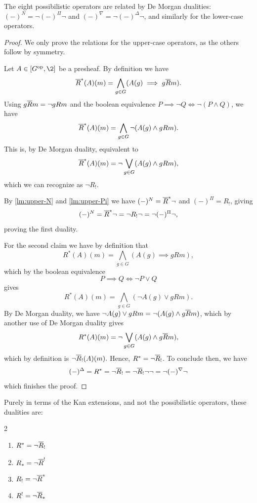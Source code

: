 \begin{lemma}
    \label{lm:De-Morgan-duality}
    The eight possibilistic operators are related by De Morgan dualities: $(-)^N = \neg (-)^\Pi \neg$ and $(-)^\nabla = \neg (-)^\Delta \neg$, and similarly for the lower-case operators. 
\end{lemma}
\begin{proof}
    We only prove the relations for the upper-case operators, as the others follow by symmetry. 

    Let $A\in [G\op, \2]$ be a presheaf. By definition we have 
    \[\overline{R}^*(A)(m) = \bigwedge_{g\in G}(A(g)\implies g\overline{R} m).\]
    Using $g \overline{R} m = \neg gRm$ and the boolean equivalence $P\implies \neg Q \iff \neg (P\wedge Q)$, we have 
    \[\overline{R}^*(A)(m) = \bigwedge_{g\in G}\neg (A(g)\wedge g R m).\]
    This is, by De Morgan duality, equivalent to 
    \[\overline{R}^*(A)(m) = \neg\bigvee_{g\in G}(A(g)\wedge g R m),\]
    which we can recognize as $\neg R_!$. 

    By \cref{lm:upper-N} and \cref{lm:upper-Pi} we have $(-)^N = \overline{R}^*\neg$ and $(-)^\Pi = R_!$, giving 
    \[(-)^N = \overline{R}^*\neg = \neg R_!\neg = \neg (-)^\Pi\neg,\]
    proving the first duality. 

    For the second claim we have by definition that 
    \[R^*(A)(m) = \bigwedge_{g\in G}(A(g)\implies gRm),\]
    which by the boolean equivalence 
    \[P\implies Q \iff \neg P\vee Q\]
    gives 
    \[R^*(A)(m) = \bigwedge_{g\in G}(\neg A(g)\vee gRm).\]
    By De Morgan duality, we have $\neg A(g)\vee gRm = \neg(A(g)\wedge g\overline{R} m)$, which by another use of De Morgan duality gives 
    \[R^*(A)(m) = \neg\bigvee_{g\in G}(A(g)\wedge g\overline{R} m),\]
    which by definition is $\neg \overline{R}_!(A)(m).$ Hence, $R^* = \neg \overline{R}_!$. To conclude then, we have
    \[(-)^\Delta = R^* =\neg\overline{R}_! = \neg \overline{R}_! \neg\neg = \neg (-)^\nabla \neg\] 
    which finishes the proof. 
\end{proof}

\begin{remark}
    Purely in terms of the Kan extensions, and not the possibilistic operators, these dualities are: 
    \begin{multicols}{2}
    \begin{enumerate}
        \item $R^* = \neg \overline{R}_!$
        \item $R_* = \neg \overline{R}^!$
        \item $R_! = \neg \overline{R}^*$
        \item $R^! = \neg \overline{R}_*$
    \end{enumerate}
    \end{multicols}
\end{remark}

